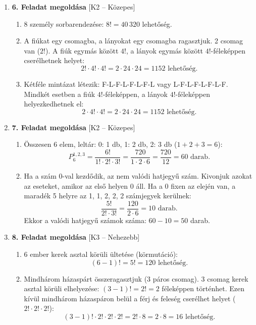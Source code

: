 \documentclass[12pt,a4paper]{article}
\begin{document}
\begin{enumerate}[label=\arabic*., leftmargin=*]
    \item \textbf{6. Feladat megoldása} \textsf{\small [K2 – Közepes]}
    \begin{enumerate}[label=\alph*)]
        \item 8 személy sorbarendezése: $8! = 40\,320$ lehetőség.
        \item A fiúkat egy csomagba, a lányokat egy csomagba ragasztjuk. 2 csomag van ($2!$). A fiúk egymás között $4!$, a lányok egymás között $4!$-féleképpen cserélhetnek helyet:
        \[
        2! \cdot 4! \cdot 4! = 2 \cdot 24 \cdot 24 = 1152 \text{ lehetőség.}
        \]
        \item Kétféle mintázat létezik: F-L-F-L-F-L-F-L vagy L-F-L-F-L-F-L-F. Mindkét esetben a fiúk $4!$-féleképpen, a lányok $4!$-féleképpen helyezkedhetnek el:
        \[
        2 \cdot 4! \cdot 4! = 2 \cdot 24 \cdot 24 = 1152 \text{ lehetőség.}
        \]
    \end{enumerate}

    \vspace{0.3cm}

    \item \textbf{7. Feladat megoldása} \textsf{\small [K2 – Közepes]}
    \begin{enumerate}[label=\alph*)]
        \item Összesen 6 elem, leltár: 0: 1 db, 1: 2 db, 2: 3 db ($1+2+3=6$):
        \[
        P_6^{1, 2, 3} = \frac{6!}{1! \cdot 2! \cdot 3!} = \frac{720}{1 \cdot 2 \cdot 6} = \frac{720}{12} = 60 \text{ darab.}
        \]
        \item Ha a szám 0-val kezdődik, az nem valódi hatjegyű szám. Kivonjuk azokat az eseteket, amikor az első helyen 0 áll. Ha a 0 fixen az elején van, a maradék 5 helyre az 1, 1, 2, 2, 2 számjegyek kerülnek:
        \[
        \frac{5!}{2! \cdot 3!} = \frac{120}{2 \cdot 6} = 10 \text{ darab.}
        \]
        Ekkor a valódi hatjegyű számok száma: $60 - 10 = 50$ darab.
    \end{enumerate}

    \vspace{0.3cm}

    \item \textbf{8. Feladat megoldása} \textsf{\small [K3 – Nehezebb]}
    \begin{enumerate}[label=\alph*)]
        \item 6 ember kerek asztal körüli ültetése (körmutáció):
        \[
        (6 - 1)! = 5! = 120 \text{ lehetőség.}
        \]
        \item Mindhárom házaspárt összeragasztjuk (3 páros csomag). 3 csomag kerek asztal körüli elhelyezése: $(3-1)! = 2! = 2$ féleképpen történhet. Ezen kívül mindhárom házaspáron belül a férj és feleség cserélhet helyet ($2! \cdot 2! \cdot 2!$):
        \[
        (3-1)! \cdot 2! \cdot 2! \cdot 2! = 2! \cdot 8 = 2 \cdot 8 = 16 \text{ lehetőség.}
        \]
    \end{enumerate}


\end{enumerate}
\end{document}
